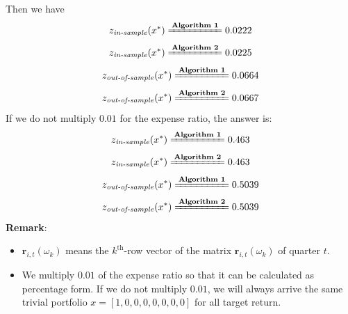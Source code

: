 \documentclass[11pt,a4paper]{article}
\begin{document}
Then we have $$z_{\text{\textit{in-sample}}}(x^{*}) \xlongequal{\textbf{Algorithm 1}}0.0222 $$$$
 z_{\text{\textit{in-sample}}}(x^{*}) \xlongequal{\textbf{Algorithm 2}}0.0225$$
 $$z_{\text{\textit{out-of-sample}}}(x^{*}) \xlongequal{\textbf{Algorithm 1}}0.0664$$
 $$z_{\text{\textit{out-of-sample}}}(x^{*}) \xlongequal{\textbf{Algorithm 2}}0.0667$$
 If we do not multiply $0.01$ for the expense ratio, the answer is:
$$z_{\text{\textit{in-sample}}}(x^{*}) \xlongequal{\textbf{Algorithm 1}}0.463 $$$$
z_{\text{\textit{in-sample}}}(x^{*}) \xlongequal{\textbf{Algorithm 2}}0.463$$
$$z_{\text{\textit{out-of-sample}}}(x^{*}) \xlongequal{\textbf{Algorithm 1}}0.5039$$
$$z_{\text{\textit{out-of-sample}}}(x^{*}) \xlongequal{\textbf{Algorithm 2}}0.5039$$
\textbf{Remark}:
\begin{itemize}
	\item $\textbf{r}_{i,t}(\omega_{k})$ means the $k^{\text{th}}$-row vector of the matrix $\mathbf{r}_{i,t}(\omega_{k})$ of quarter $t$.
	\item We multiply $0.01$ of the expense ratio so that it can be calculated as percentage form. If we do not multiply $0.01$, we will always arrive the same trivial portfolio $x=[1,0,0,0,0,0,0,0]$ for all target return.
\end{itemize} 
\end{document}
